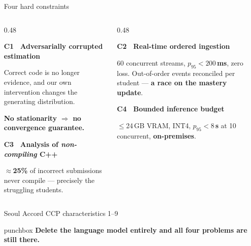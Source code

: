 \documentclass[aspectratio=169,11pt]{beamer}
\newcommand{\punch}[1]{%
  \vfill
  \begin{beamercolorbox}[wd=\textwidth,sep=5pt,rounded=true]{punchbox}
    \centering\small #1
  \end{beamercolorbox}%
}
\newcommand{\lead}[1]{\textbf{\color{accent}#1}}
\begin{document}
\begin{frame}{Four hard constraints}
  \vspace{0.6em}
  \begin{columns}[T]
    \begin{column}{0.48\textwidth}
      {\small\lead{C1 \ Adversarially corrupted estimation}\par\vspace{0.1em}
      Correct code is no longer evidence, and our own intervention changes the
      generating distribution.\par\vspace{0.15em}
      {\color{flag}\textbf{No stationarity $\Rightarrow$ no convergence guarantee.}}\par}
      \vspace{1.0em}
      {\small\lead{C3 \ Analysis of \emph{non-compiling} C++}\par\vspace{0.1em}
      \textbf{$\approx$25\%} of incorrect submissions never compile --- precisely the
      struggling students.\par}
    \end{column}
    \begin{column}{0.48\textwidth}
      {\small\lead{C2 \ Real-time ordered ingestion}\par\vspace{0.1em}
      60 concurrent streams, \textbf{$p_{95}<200$\,ms}, zero loss. Out-of-order events
      reconciled per student --- \textbf{a race on the mastery update}.\par}
      \vspace{1.0em}
      {\small\lead{C4 \ Bounded inference budget}\par\vspace{0.1em}
      $\le$24\,GB VRAM, INT4, \textbf{$p_{95}<8$\,s} at 10 concurrent,
      \textbf{on-premises}.\par}
    \end{column}
  \end{columns}
  \vspace{0.5em}
  {\centering\scriptsize\color{muted}Seoul Accord CCP characteristics 1--9\par}
  \punch{\textbf{Delete the language model entirely and all four problems are still there.}}
\end{frame}
\end{document}
